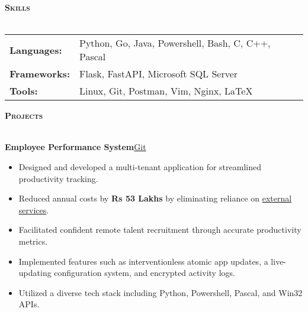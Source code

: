 \documentclass[a4paper]{article}
\newcommand{\lineunder} {
\vspace*{-8pt} \\
\hspace*{-18pt} \hrulefill \\
}
\newcommand{\header}[1]{%
{\hspace*{-18pt}\vspace*{6pt} \textsc{\textbf{\Large{#1}}}}%
\vspace*{-6pt} \lineunder
}
\begin{document}

\header{Skills}
\vspace{1mm}

\begin{tabular}{V{5cm} @{\hskip 0.6cm} V{12cm}}
\textbf{Languages:} & Python, Go, Java, Powershell, Bash, C, C++, Pascal \\
\textbf{Frameworks:} & Flask, FastAPI, Microsoft SQL Server \\
\textbf{Tools:} & Linux, Git, Postman, Vim, Nginx, \LaTeX{} \\
\end{tabular}

\vspace{4mm}


\header{Projects}
\vspace{1mm}

{\textbf{Employee Performance System}}\hfill \href{https://github.com/swarnimcodes/employee-performance}{Git}\\
\begin{itemize} 
    \item Designed and developed a multi-tenant
    application for streamlined productivity
    tracking. \\
    \item Reduced annual costs by \textbf{Rs 53 Lakhs} by eliminating 
    reliance on \href{https://desktime.com/}{external services}. \\
    \item Facilitated confident remote talent recruitment through accurate productivity metrics.\\ 
    \item Implemented features such as interventionless atomic app updates,
    a live-updating configuration system, and encrypted activity logs. \\
    \item Utilized a diverse tech stack including Python, Powershell, Pascal, and Win32 APIs. \\
\end{itemize}
\vspace*{2mm}
\end{document}
